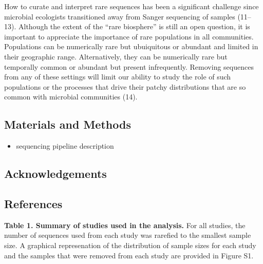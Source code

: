 \documentclass[]{article}
\begin{document}
How to curate and interpret rare sequences has been a significant
challenge since microbial ecologists transitioned away from Sanger
sequencing of samples (11--13). Although the extent of the ``rare
biosphere'' is still an open question, it is important to appreciate the
importance of rare populations in all communities. Populations can be
numerically rare but ubuiquitous or abundant and limited in their
geographic range. Alternatively, they can be numerically rare but
temporally common or abundant but present infrequently. Removing
sequences from any of these settings will limit our ability to study the
role of such populations or the processes that drive their patchy
distributions that are so common with microbial communities (14).

\newpage

\subsection{Materials and Methods}\label{materials-and-methods}

\begin{itemize}
\itemsep1pt\parskip0pt
\item
  sequencing pipeline description
\end{itemize}

\subsection{Acknowledgements}\label{acknowledgements}

\newpage

\subsection{References}\label{references}

\newpage

\textbf{Table 1. Summary of studies used in the analysis.} For all
studies, the number of sequences used from each study was rarefied to
the smallest sample size. A graphical represenation of the distribution
of sample sizes for each study and the samples that were removed from
each study are provided in Figure S1.
\end{document}
